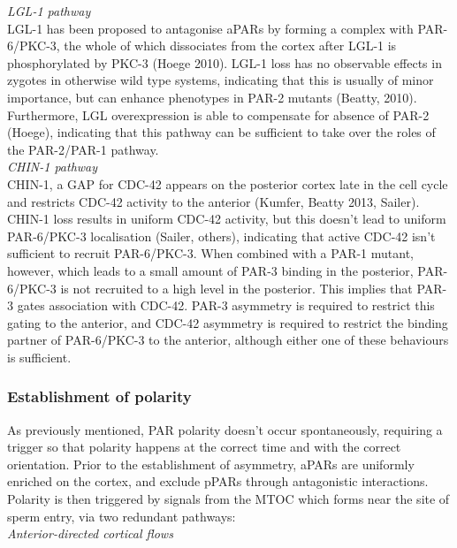 \documentclass[12pt]{"article"}
\begin{document}
\textit{LGL-1 pathway}\\

LGL-1 has been proposed to antagonise aPARs by forming a complex with PAR-6/PKC-3, the whole of which dissociates from the cortex after LGL-1 is phosphorylated by PKC-3 (Hoege 2010). LGL-1 loss has no observable effects in zygotes in otherwise wild type systems, indicating that this is usually of minor importance, but can enhance phenotypes in PAR-2 mutants (Beatty, 2010). Furthermore, LGL overexpression is able to compensate for absence of PAR-2 (Hoege), indicating that this pathway can be sufficient to take over the roles of the PAR-2/PAR-1 pathway.\\

\textit{CHIN-1 pathway}\\

CHIN-1, a GAP for CDC-42 appears on the posterior cortex late in the cell cycle and restricts CDC-42 activity to the anterior (Kumfer, Beatty 2013, Sailer). CHIN-1 loss results in uniform CDC-42 activity, but this doesn’t lead to uniform PAR-6/PKC-3 localisation (Sailer, others), indicating that active CDC-42 isn’t sufficient to recruit PAR-6/PKC-3. When combined with a PAR-1 mutant, however, which leads to a small amount of PAR-3 binding in the posterior, PAR-6/PKC-3 is not recruited to a high level in the posterior. This implies that PAR-3 gates association with CDC-42. PAR-3 asymmetry is required to restrict this gating to the anterior, and CDC-42 asymmetry is required to restrict the binding partner of PAR-6/PKC-3 to the anterior, although either one of these behaviours is sufficient.\\


\subsubsection{Establishment of polarity}

As previously mentioned, PAR polarity doesn’t occur spontaneously, requiring a trigger so that polarity happens at the correct time and with the correct orientation. Prior to the establishment of asymmetry, aPARs are uniformly enriched on the cortex, and exclude pPARs through antagonistic interactions. Polarity is then triggered by signals from the MTOC which forms near the site of sperm entry, via two redundant pathways:\\

\textit{Anterior-directed cortical flows}\\
\end{document}
